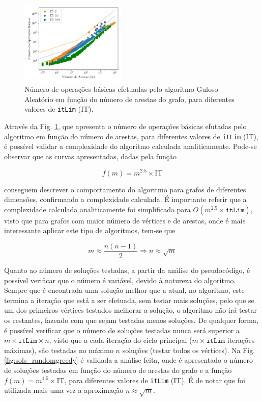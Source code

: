 \documentclass[mirror, portugues]{revdetua}
\begin{document}
\begin{figure}[H]
    \centering
    \includegraphics[width=0.45\textwidth]{../assets/ops_Random Greedy.png}
    \caption{Número de operações básicas efetuadas pelo algoritmo Guloso Aleatório em função do número de arestas do grafo, para diferentes valores de \texttt{itLim} (IT).}
    \label{fig:random_greedy}
\end{figure}

Através da Fig. \ref{fig:random_greedy}, que apresenta o número de operações básicas efutadas pelo algoritmo em função do número de arestas, para diferentes valores de \texttt{itLim} (IT), é possível validar a complexidade do algoritmo calculada analiticamente. Pode-se observar que as curvas apresentadas, dadas pela função

$$f(m) = m^{2.5} \times \text{IT}$$

\noindent conseguem descrever o comportamento do algoritmo para grafos de diferentes dimensões, confirmando a complexidade calculada. É importante referir que a complexidade calculada analiticamente foi simplificada para $O(m^{2.5} \times \texttt{itLim})$, visto que para grafos com maior número de vértices e de arestas, onde é mais interessante aplicar este tipo de algoritmos, tem-se que

$$m \approx \frac{n(n-1)}{2} \Rightarrow n \approx \sqrt{m}$$

Quanto ao número de soluções testadas, a partir da análise do pseudocódigo, é possível verificar que o número é variável, devido à natureza do algoritmo. Sempre que é encontrada uma solução melhor que a atual, no algoritmo, este termina a iteração que está a ser efetuada, sem testar mais soluções, pelo que se um dos primeiros vértices testados melhorar a solução, o algoritmo não irá testar os restantes, fazendo com que sejam testadas menos soluções. De qualquer forma, é possível verificar que o número de soluções testadas nunca será superior a $m \times \texttt{itLim} \times n$, visto que a cada iteração do ciclo principal ($m \times \texttt{itLim}$ iterações máximas), são testadas no máximo $n$ soluções (testar todos os vértices). Na Fig. \ref{fig:sols_randomgreedy} é validada a análise feita, onde é apresentado o número de soluções testadas em função do número de arestas do grafo e a função $f(m) = m^{1.5} \times \text{IT}$, para diferentes valores de \texttt{itLim} (IT). É de notar que foi utilizada mais uma vez a aproximação $n \approx \sqrt{m}$.
\end{document}
